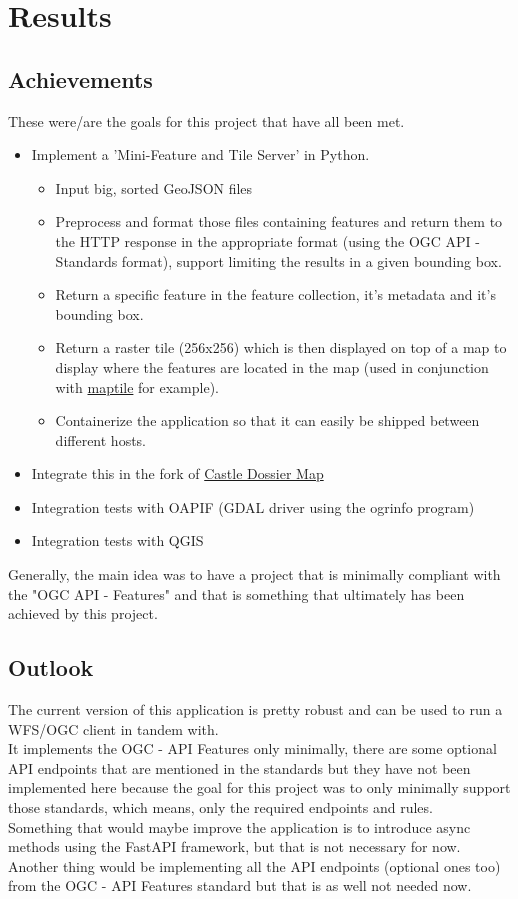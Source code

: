\chapter{Results}

\section{Achievements}
These were/are the goals for this project that have all been met.\\
\begin{itemize}
	\item Implement a 'Mini-Feature and Tile Server' in Python.
	\begin{itemize}
		\item Input big, sorted GeoJSON files
		\item Preprocess and format those files containing features and return them to the HTTP response in the appropriate format (using the OGC API - Standards format), support limiting the results in a given bounding box.
		\item Return a specific feature in the feature collection, it's metadata and it's bounding box.
		\item Return a raster tile (256x256) which is then displayed on top of a map to display where the features are located in the map (used in conjunction with \href{maptile.com}{maptile} for example).
		\item Containerize the application so that it can easily be shipped between different hosts.
	\end{itemize}
	\item Integrate this in the fork of \href{https://gitlab.com/geometalab/castle-map}{Castle Dossier Map}
	\item Integration tests with OAPIF (GDAL driver using the ogrinfo program)
	\item Integration tests with QGIS
\end{itemize}
Generally, the main idea was to have a project that is minimally compliant with the "OGC API - Features" and that is something that ultimately has been achieved by this project.
\newpage
\section{Outlook}
The current version of this application is pretty robust and can be used to run a WFS/OGC client in tandem with.\\
It implements the OGC - API Features only minimally, there are some optional API endpoints that are mentioned in the standards but they have not been implemented here because the goal for this project was to only minimally support those standards, which means, only the required endpoints and rules.\\
\newline
Something that would maybe improve the application is to introduce async methods using the FastAPI framework, but that is not necessary for now.\\
Another thing would be implementing all the API endpoints (optional ones too) from the OGC - API Features standard but that is as well not needed now.

